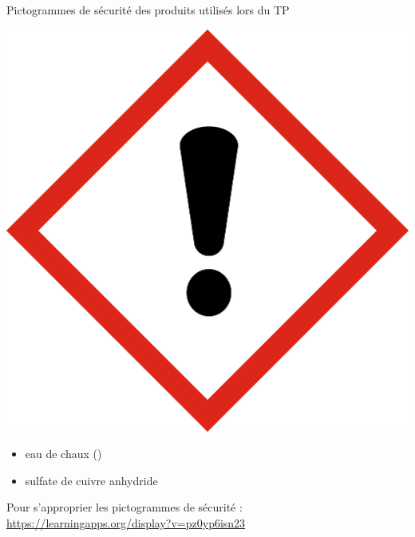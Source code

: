 \begin{doc}{Pictogrammes de sécurité des produits utilisés lors du TP}
\begin{minipage}{0.5\linewidth}
    \end{minipage}
    \begin{minipage}{0.5\linewidth}\vspace{-1.8cm}
    \begin{center}
        \includegraphics[scale=0.3]{Images/SGH07_PointExclamation.jpg}
    \end{center}
    \begin{itemize}
            \item eau de chaux ()
            \item sulfate de cuivre anhydride 
    \end{itemize}
    \end{minipage}
    \vspace{1cm}
    
    \begin{large}
    \end{large}Pour s'approprier les pictogrammes de sécurité : \url{https://learningapps.org/display?v=pz0yp6isn23} 
\end{doc}

